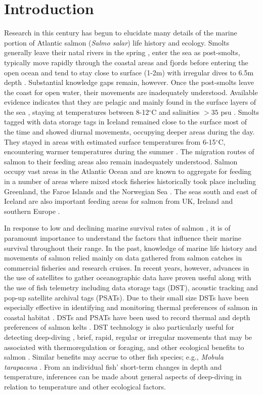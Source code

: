 \section{Introduction}
\label{intro}
Research in this century has begun to elucidate many details of the marine portion of Atlantic salmon (\textit{Salmo salar}) life history and ecology. 
Smolts generally leave their natal rivers in the spring \citep{Otero2014}, enter the sea as post-smolts, typically move rapidly through the coastal areas and fjords before entering the open ocean \citep{Thorstad2011,Lacroix2004,Gudjonsson2005} and tend to stay close to surface (1-2m) with irregular dives to 6.5m depth \citep{Davidsen2008}.  
Substantial knowledge gaps remain, however. 
Once the post-smolts leave the coast for open water, their movements are inadequately understood. 
Available evidence indicates that they are pelagic and mainly found in the surface layers of the sea \citep{Holm2006}, staying at temperatures between 8-12$^\circ$C \citep{Friedland2000} and salinities $> 35$ psu \citep{Holm2003}. 
Smolts tagged with data storage tags in Iceland remained close to the surface most of the time and showed diurnal movements, occupying deeper areas during the day. They stayed in areas with estimated surface temperatures from 6-15$^\circ$C, encountering warmer temperatures during the summer \citep{Gudjonsson2015}. 
The migration routes of salmon to their feeding areas also remain inadequately understood. 
Salmon occupy vast areas in the Atlantic Ocean and are known to aggregate for feeding in a number of areas where mixed stock fisheries historically took place including Greenland, the Faroe Islands and the Norwegian Sea \citep{Chaput2012}. 
The seas south and east of Iceland are also important feeding areas for salmon from UK, Ireland and southern Europe \citep{Olafsson2015}. 

In response to low and declining marine survival rates of salmon \citep{Chaput2012}, it is of paramount importance to understand the factors that influence their marine survival throughout their range. 
In the past, knowledge of marine life history and movements of salmon relied mainly on data gathered from salmon catches in commercial fisheries and research cruises. 
In recent years, however, advances in the use of satellites to gather oceanographic data have proven useful along with the use of fish telemetry including data storage tags (DST), acoustic tracking and pop-up satellite archival tags (PSATs). 
Due to their small size DSTs have been especially effective in identifying and monitoring thermal preferences of salmon in coastal habitat \citep{Reddin2004,Reddin2006}.
DSTs and PSATs have been used to record thermal and depth preferences of salmon kelts \citep{Reddin2011,Chittenden2013,Lacroix2013,Strom2017}. 
DST technology is also particularly useful for detecting deep-diving , brief, rapid, regular or irregular movements that may be associated with thermoregulation or foraging, and other ecological benefits to salmon \citep{Reddin2006}. 
Similar benefits may accrue to  other fish species; e.g., \textit{Mobula tarapacana} \citep{Thorrold2014}. 
From an  individual fish' short-term changes in depth and temperature, inferences can be made about general aspects of deep-diving in relation to temperature and other ecological factors.


